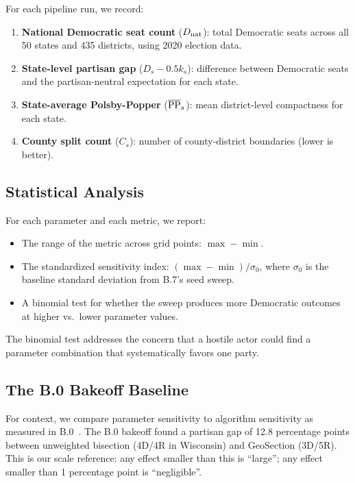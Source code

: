 For each pipeline run, we record:

\begin{enumerate}
\item \textbf{National Democratic seat count} ($D_{\rm nat}$):
      total Democratic seats across all 50 states and 435 districts,
      using 2020 election data.
\item \textbf{State-level partisan gap} ($D_s - 0.5k_s$):
      difference between Democratic seats and the partisan-neutral
      expectation for each state.
\item \textbf{State-average Polsby-Popper} ($\overline{\mathrm{PP}}_s$):
      mean district-level compactness for each state.
\item \textbf{County split count} ($C_s$):
      number of county-district boundaries (lower is better).
\end{enumerate}

\subsection{Statistical Analysis}

For each parameter and each metric, we report:
\begin{itemize}
\item The range of the metric across grid points: $\max - \min$.
\item The standardized sensitivity index: $(\max - \min) / \sigma_0$,
      where $\sigma_0$ is the baseline standard deviation from B.7's
      seed sweep.
\item A binomial test for whether the sweep produces more Democratic
      outcomes at higher vs.\ lower parameter values.
\end{itemize}

The binomial test addresses the concern that a hostile actor could
find a parameter combination that systematically favors one party.

\subsection{The B.0 Bakeoff Baseline}

For context, we compare parameter sensitivity to algorithm sensitivity
as measured in B.0~\citep{b0paper}.
The B.0 bakeoff found a partisan gap of 12.8 percentage points between
unweighted bisection (4D/4R in Wisconsin) and GeoSection (3D/5R).
This is our scale reference: any effect smaller than this is ``large'';
any effect smaller than 1 percentage point is ``negligible''.
